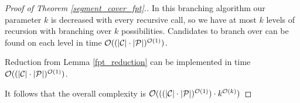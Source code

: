 \begin{proof}[Proof of Theorem \ref{segment_cover_fpt}.]
In this branching algorithm our parameter $k$ is decreased with every
recursive call, so we have at most $k$ levels of recursion with
branching over $k$ possibilities. Candidates to branch over
can be found on each level in time $\mathcal{O}((|\mathcal{C}|\cdot|\mathcal{P}|)^{\mathcal{O}(1)})$.

Reduction from Lemma \ref{fpt_reduction} can be implemented
in time $\mathcal{O}((|\mathcal{C}|\cdot|\mathcal{P}|)^{\mathcal{O}(1)})$.

It follows that the overall complexity
is $\mathcal{O}(((|\mathcal{C}|\cdot|\mathcal{P}|)^{\mathcal{O}(1)}) \cdot k^{\mathcal{O}(k)})$
\end{proof}

